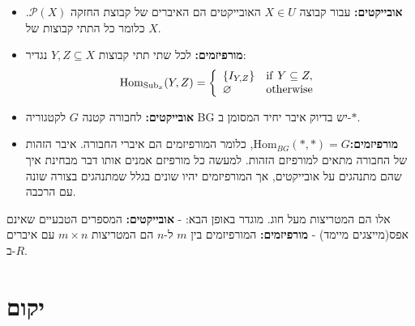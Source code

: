 \documentclass{tstextbook}
\begin{document}
\begin{definition}
  \begin{itemize}
    \item \textbf{אובייקטים:} עבור קבוצה \(X \in U\) האובייקטים הם האיברים של קבוצת החזקה \(\mathcal{P}(X)\). כלומר כל התתי קבוצות של \(X\).
    \item \textbf{מורפיזמים:} לכל שתי תתי קבוצות \(Y,Z \subseteq X\) נגדיר:
$$\operatorname{Hom}_{\operatorname{Sub}_{x}}(Y,Z)={\left\{\begin{array}{l l}{\{I_{Y,Z}\}}&{{\mathrm{if~}}Y\subseteq Z,}\\ {\varnothing }&{{\mathrm{otherwise}}}\end{array}\right.}$$
  \end{itemize}
\end{definition}
\begin{definition}[הקטגוריה BG]
  \begin{itemize}
    \item \textbf{אובייקטים:} לחבורה קטנה \(G\) לקטגוריה BG יש בדיוק איבר יחיד המסומן ב-\(*\).
    \item \textbf{מורפיזמים:}\({\mathrm{Hom}}_{B G}(*,*)=G\), כלומר המורפיזמים הם איברי החבורה. איבר הזהות של החבורה מתאים למורפיזם הזהות.
למעשה כל מורפיזם אמנים אותו דבר מבחינת איך שהם מתנהגים על אובייקטים, אך המורפיזמים יהיו שונים בגלל שמתנהגים בצורה שונה עם הרכבה.
  \end{itemize}
\end{definition}
\begin{definition}
אלו הם המטריצות מעל חוג. מוגדר באופן הבא:
- \textbf{אובייקטים:} המספרים הטבעיים שאינם אפס(מייצגים מיימד)
- \textbf{מורפיזמים:} המורפיזמים בין \(m\) ל-\(n\) הם המטריצות \(m\times n\) עם איברים ב-\(R\).

\end{definition}
\section{יקום}
\end{document}
